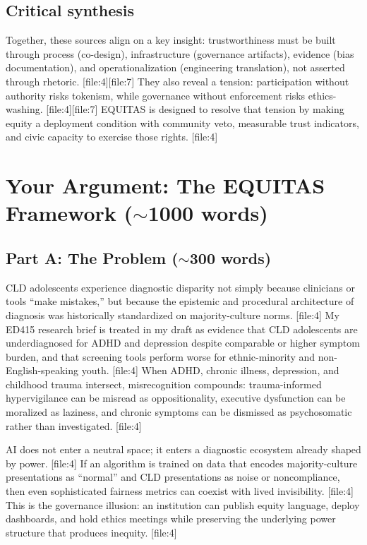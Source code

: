 \documentclass[12pt]{article}
\begin{document}
\subsection*{Critical synthesis}
Together, these sources align on a key insight: trustworthiness must be built through process (co-design), infrastructure (governance artifacts), evidence (bias documentation), and operationalization (engineering translation), not asserted through rhetoric. [file:4][file:7]
They also reveal a tension: participation without authority risks tokenism, while governance without enforcement risks ethics-washing. [file:4][file:7]
EQUITAS is designed to resolve that tension by making equity a deployment condition with community veto, measurable trust indicators, and civic capacity to exercise those rights. [file:4]

\section{Your Argument: The EQUITAS Framework (\texorpdfstring{$\sim$}{\textasciitilde}1000 words)}

\subsection{Part A: The Problem (\texorpdfstring{$\sim$}{\textasciitilde}300 words)}
CLD adolescents experience diagnostic disparity not simply because clinicians or tools ``make mistakes,'' but because the epistemic and procedural architecture of diagnosis was historically standardized on majority-culture norms. [file:4]
My ED415 research brief is treated in my draft as evidence that CLD adolescents are underdiagnosed for ADHD and depression despite comparable or higher symptom burden, and that screening tools perform worse for ethnic-minority and non-English-speaking youth. [file:4]
When ADHD, chronic illness, depression, and childhood trauma intersect, misrecognition compounds: trauma-informed hypervigilance can be misread as oppositionality, executive dysfunction can be moralized as laziness, and chronic symptoms can be dismissed as psychosomatic rather than investigated. [file:4]

AI does not enter a neutral space; it enters a diagnostic ecosystem already shaped by power. [file:4]
If an algorithm is trained on data that encodes majority-culture presentations as ``normal'' and CLD presentations as noise or noncompliance, then even sophisticated fairness metrics can coexist with lived invisibility. [file:4]
This is the governance illusion: an institution can publish equity language, deploy dashboards, and hold ethics meetings while preserving the underlying power structure that produces inequity. [file:4]
\end{document}
